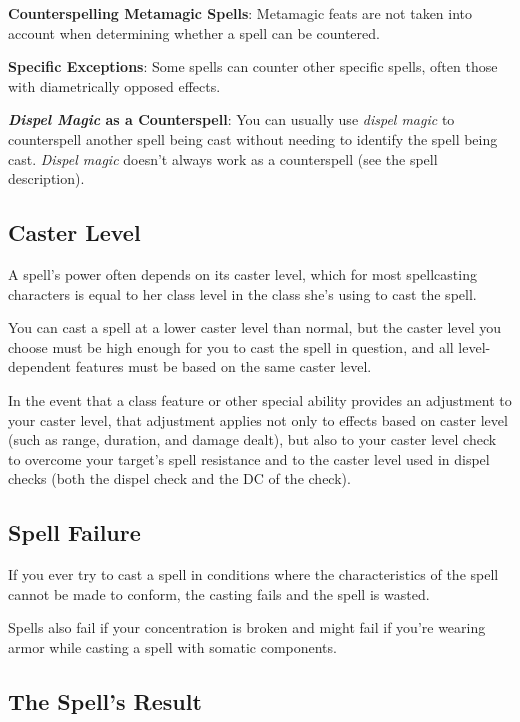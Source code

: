 \textbf{Counterspelling Metamagic Spells}: Metamagic feats are not taken into account when determining whether a spell can be countered.
				
\textbf{Specific Exceptions}: Some spells can counter other specific spells, often those with diametrically opposed effects.
				
\textbf{\textit{Dispel Magic } as a Counterspell}: You can usually use \textit{dispel magic }to counterspell another spell being cast without needing to identify the spell being cast. \textit{Dispel magic }doesn't always work as a counterspell (see the spell description).
				
\subsection{Caster Level}

				
A spell's power often depends on its caster level, which for most spellcasting characters is equal to her class level in the class she's using to cast the spell. 
				
You can cast a spell at a lower caster level than normal, but the caster level you choose must be high enough for you to cast the spell in question, and all level-dependent features must be based on the same caster level. 
				
In the event that a class feature or other special ability provides an adjustment to your caster level, that adjustment applies not only to effects based on caster level (such as range, duration, and damage dealt), but also to your caster level check to overcome your target's spell resistance and to the caster level used in dispel checks (both the dispel check and the DC of the check). 
				
\subsection{Spell Failure}

				
If you ever try to cast a spell in conditions where the characteristics of the spell cannot be made to conform, the casting fails and the spell is wasted.
				
Spells also fail if your concentration is broken and might fail if you're wearing armor while casting a spell with somatic components.
				
\subsection{The Spell's Result}

